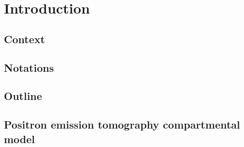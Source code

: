 \chapter{Introduction}
\label{cha:Introduction}

\section{Context}
\label{sec:Context}

\section{Notations}
\label{sec:Notations}

\section{Outline}
\label{sec:Outline}

\section{Positron emission tomography compartmental model}
\label{sec:Positron emission tomography compartmental model}
